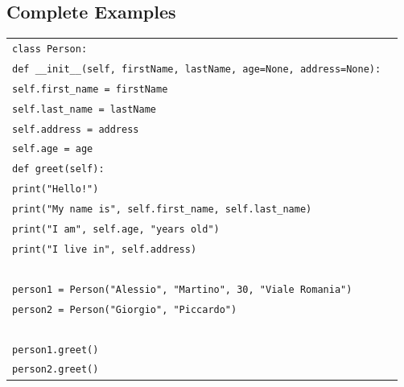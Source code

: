 \documentclass[t,handout,9pt]{beamer}
\begin{document}
\subsection{Complete Examples}
\begin{frame}
\vfill
\begin{table}[]
\begin{flushleft}
\begin{tabular}{ll}
\texttt{class Person:} &  \\
\texttt{\qquad def \_\_init\_\_(self, firstName, lastName, age=None, address=None):} &  \\
\texttt{\qquad\qquad self.first\_name = firstName} &  \\
\texttt{\qquad\qquad self.last\_name = lastName} &  \\
\texttt{\qquad\qquad self.address = address} &  \\
\texttt{\qquad\qquad self.age = age} &  \\
\texttt{\qquad def greet(self):} &  \\
\texttt{\qquad\qquad print("Hello!")} &  \\
\texttt{\qquad\qquad print("My name is", self.first\_name, self.last\_name)} &  \\
\texttt{\qquad\qquad print("I am", self.age, "years old")} &  \\
\texttt{\qquad\qquad print("I live in", self.address)} &  \\
\texttt{ } &  \\
\texttt{person1 = Person("Alessio", "Martino", 30, "Viale Romania")} &  \\
\texttt{person2 = Person("Giorgio", "Piccardo")} &  \\
\texttt{ } &  \\
\texttt{person1.greet()} &  \\
\texttt{person2.greet()} &  \\
\end{tabular}
\end{flushleft}
\end{table}
\vfill
\end{frame}
%
\end{document}
